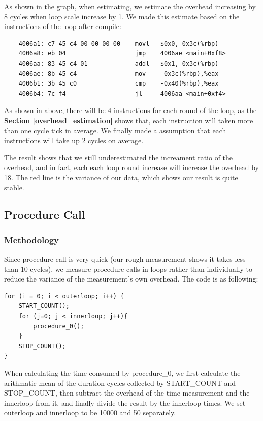 As shown in the graph, when estimating, we estimate the overhead increasing by 8 cycles when loop scale increase by 1. We made this estimate based on the instructions of the loop after compile:

\begin{lstlisting}
    4006a1:	c7 45 c4 00 00 00 00 	movl   $0x0,-0x3c(%rbp)
    4006a8:	eb 04                	jmp    4006ae <main+0xf8>
    4006aa:	83 45 c4 01          	addl   $0x1,-0x3c(%rbp)
    4006ae:	8b 45 c4             	mov    -0x3c(%rbp),%eax
    4006b1:	3b 45 c0             	cmp    -0x40(%rbp),%eax
    4006b4:	7c f4                	jl     4006aa <main+0xf4>
\end{lstlisting}

As shown in above, there will be 4 instructions for each round of the loop, as the \textbf{Section \ref{overhead_estimation}} shows that, each instruction will taken more than one cycle tick in average.
We finally made a assumption that each instructions will take up 2 cycles on average.

The result shows that we still underestimated the increament ratio of the overhead, and in fact, each each loop round increase will increase the overhead by 18. The red line is the variance of our data, which shows our result is quite stable.

\subsection{Procedure Call}

\subsubsection{Methodology}

Since procedure call is very quick (our rough measurement shows it takes less than 10 cycles), we measure procedure calls in loops rather than individually to reduce the variance of the measurement's own overhead. The code is as following:

\begin{lstlisting}
for (i = 0; i < outerloop; i++) {
    START_COUNT();
    for (j=0; j < innerloop; j++){
        procedure_0();
    }
    STOP_COUNT();    
}
\end{lstlisting}

When calculating the time consumed by procedure_0, we first calculate the arithmatic mean of the duration cycles collected by START_COUNT and STOP_COUNT, then subtract the overhead of the time measurement and the innerloop from it, and finally divide the result by the innerloop times. We set outerloop and innerloop to be 10000 and 50 separately.

